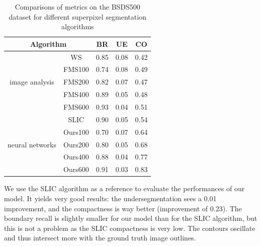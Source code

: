 \documentclass{article}
\begin{document}
        \begin{table}[!ht]
            \centering
            \begin{tabular}{|c|c|ccc|}
                \hline
                \multicolumn{2}{|c|}{Algorithm} & BR & UE & CO\\
                \hline
                \hline
                \multirow{5}{*}{image analysis} & WS & 0.85 & 0.08 & 0.42\\
                                                & FMS100 & 0.74 & 0.08 & 0.49 \\
                                                & FMS200 & 0.82 & 0.07 & 0.47 \\
                                                & FMS400 & 0.89 & 0.05 & 0.48 \\
                                                & FMS600 & 0.93 & 0.04 & 0.51 \\
                \hline
                \multirow{5}{*}{neural networks} & SLIC & 0.90 & 0.05 & 0.54\\
                                                 & Ours100 & 0.70 & 0.07 & 0.64\\
                                                 & Ours200 & 0.80 & 0.05 & 0.68\\
                                                 & Ours400 & 0.88 & 0.04 & 0.77\\
                                                 & Ours600 & 0.91 & 0.03 & 0.83\\
                \hline
            \end{tabular}
            \caption{Comparisons of metrics on the BSDS500 dataset for different superpixel segmentation algorithms}
        \end{table}
        \par
        We use the SLIC algorithm as a reference to evaluate the performances of our model. It yields very good results: the undersegmentation sees a 0.01 improvement, and the compactness is way better (improvement of 0.23). The boundary recall is slightly smaller for our model than for the SLIC algorithm, but this is not a problem as the SLIC compactness is very low. The contours oscillate and thus intersect more with the ground truth image outlines.
\end{document}
